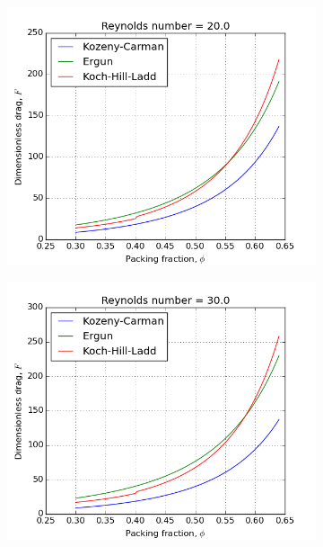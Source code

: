 \begin{figure}[!ht]
    \begin{subfigure}[b]{0.45\textwidth}
        \centering
        \includegraphics[width=\textwidth]{figures/pressure-drop-correlations/Re20.png}
    \end{subfigure}
    \begin{subfigure}[b]{0.45\textwidth}
        \centering
        \includegraphics[width=\textwidth]{figures/pressure-drop-correlations/Re30.png}
    \end{subfigure}


\end{figure}

